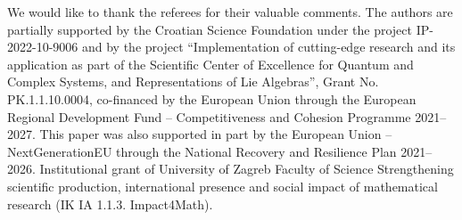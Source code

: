 \documentclass[pdftex]{sigma}
\numberwithin{equation}{section}
\theoremstyle{definition}
\newcommand{\1}{\textbf{1}}
\begin{document}
 We would like to thank the referees
for their valuable comments.
The authors are partially supported by the Croatian Science Foundation under the project IP-2022-10-9006 and by the project ``Implementation of
cutting-edge research and its application as part of the Scientific
 Center of Excellence for Quantum and Complex Systems, and
 Representations of Lie Algebras'', Grant No. PK.1.1.10.0004,
 co-financed by the European Union through the European Regional
 Development Fund -- Competitiveness and Cohesion Programme 2021--2027.
 This paper was also supported in part by the European Union -- NextGenerationEU through the National Recovery and Resilience Plan 2021--2026. Institutional grant of University of Zagreb Faculty of Science Strengthening scientific production, international presence and social impact of mathematical research (IK IA 1.1.3. Impact4Math).
\end{document}

